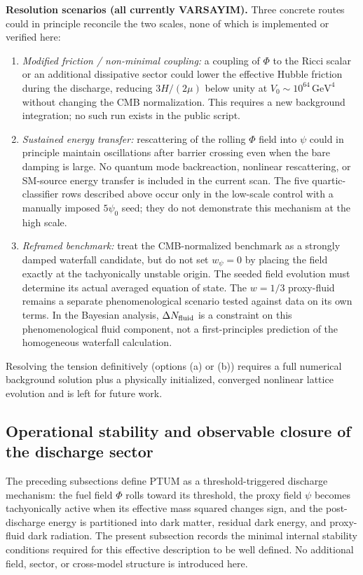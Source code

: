 \documentclass[epj]{svjour}
\begin{document}
\noindent\textbf{Resolution scenarios (all currently VARSAYIM).}
Three concrete routes could in principle reconcile the two scales,
none of which is implemented or verified here:
\begin{enumerate}[label=(\alph*)]
\item \emph{Modified friction / non-minimal coupling:} a coupling of
      $\Phi$ to the Ricci scalar or an additional dissipative sector
      could lower the effective Hubble friction during the discharge,
      reducing $3H/(2\mu)$ below unity at
      $V_0\sim10^{64}\,\mathrm{GeV}^4$ without changing the CMB
      normalization. This requires a new background integration;
      no such run exists in the public script.
\item \emph{Sustained energy transfer:} rescattering of the rolling
      $\Phi$ field into $\psi$ could in principle maintain oscillations
      after barrier crossing even when the bare damping is large.
      No quantum mode backreaction, nonlinear rescattering, or
      SM-source energy transfer is included in the current scan.
      The five quartic-classifier rows described above occur only in
      the low-scale control with a manually imposed $5\psi_0$ seed;
      they do not demonstrate this mechanism at the high scale.
\item \emph{Reframed benchmark:} treat the CMB-normalized benchmark
      as a strongly damped waterfall candidate, but do not set
      $w_\psi=0$ by placing the field exactly at the tachyonically
      unstable origin. The seeded field evolution must determine its
      actual averaged equation of state. The $w=1/3$ proxy-fluid
      remains a separate phenomenological scenario tested against
      data on its own terms. In the Bayesian analysis,
      $\Delta N_{\rm fluid}$ is a constraint on this phenomenological
      fluid component, not a first-principles prediction of the
      homogeneous waterfall calculation.
\end{enumerate}
Resolving the tension definitively (options (a) or (b)) requires
a full numerical background solution plus a physically initialized,
converged nonlinear lattice evolution and is left for future work.

\subsection{Operational stability and observable closure of the discharge sector}
\label{subsec:ptum_operational_stability}

The preceding subsections define PTUM as a threshold-triggered discharge
mechanism: the fuel field $\Phi$ rolls toward its threshold, the proxy field $\psi$ becomes
tachyonically active when its effective mass squared changes sign, and the
post-discharge energy is partitioned into dark matter, residual dark energy,
and proxy-fluid dark radiation.  The present subsection records the minimal
internal stability conditions required for this effective description to be
well defined.  No additional field, sector, or cross-model structure is
introduced here.
\end{document}

